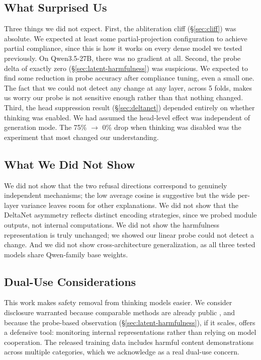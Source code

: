 \documentclass{article}
\begin{document}
\subsection{What Surprised Us}

Three things we did not expect. First, the abliteration cliff (\S\ref{sec:cliff}) was absolute. We expected at least some partial-projection configuration to achieve partial compliance, since this is how it works on every dense model we tested previously. On Qwen3.5-27B, there was no gradient at all. Second, the probe delta of exactly zero (\S\ref{sec:latent-harmfulness}) was suspicious. We expected to find some reduction in probe accuracy after compliance tuning, even a small one. The fact that we could not detect any change at any layer, across 5 folds, makes us worry our probe is not sensitive enough rather than that nothing changed. Third, the head suppression result (\S\ref{sec:deltanet}) depended entirely on whether thinking was enabled. We had assumed the head-level effect was independent of generation mode. The 75\% $\to$ 0\% drop when thinking was disabled was the experiment that most changed our understanding.

\subsection{What We Did Not Show}

We did not show that the two refusal directions correspond to genuinely independent mechanisms; the low average cosine is suggestive but the wide per-layer variance leaves room for other explanations. We did not show that the DeltaNet asymmetry reflects distinct encoding strategies, since we probed module outputs, not internal computations. We did not show the harmfulness representation is truly unchanged; we showed our linear probe could not detect a change. And we did not show cross-architecture generalization, as all three tested models share Qwen-family base weights.

\subsection{Dual-Use Considerations}

This work makes safety removal from thinking models easier. We consider disclosure warranted because comparable methods are already public \citep{grp-obliteration, heretic}, and because the probe-based observation (\S\ref{sec:latent-harmfulness}), if it scales, offers a defensive tool: monitoring internal representations rather than relying on model cooperation. The released training data includes harmful content demonstrations across multiple categories, which we acknowledge as a real dual-use concern.
\end{document}
